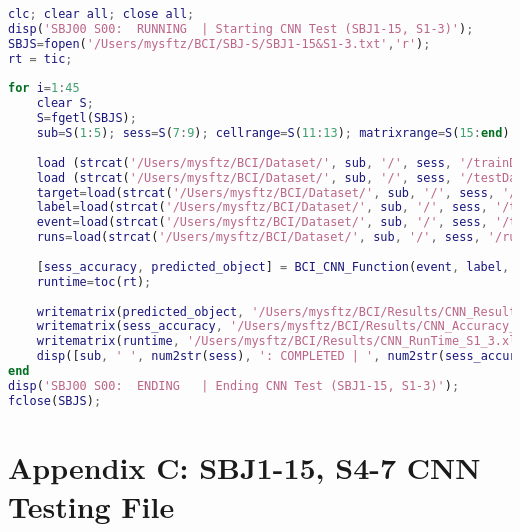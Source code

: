 \begin{lstlisting}[language=matlab]
clc; clear all; close all; 
disp('SBJ00 S00:  RUNNING  | Starting CNN Test (SBJ1-15, S1-3)');
SBJS=fopen('/Users/mysftz/BCI/SBJ-S/SBJ1-15&S1-3.txt','r');
rt = tic; 
    
for i=1:45
    clear S;
    S=fgetl(SBJS);         
    sub=S(1:5); sess=S(7:9); cellrange=S(11:13); matrixrange=S(15:end);
    
    load (strcat('/Users/mysftz/BCI/Dataset/', sub, '/', sess, '/trainData.mat'));
    load (strcat('/Users/mysftz/BCI/Dataset/', sub, '/', sess, '/testData.mat'));
    target=load(strcat('/Users/mysftz/BCI/Dataset/', sub, '/', sess, '/trainTargets.txt')); 
    label=load(strcat('/Users/mysftz/BCI/Dataset/', sub, '/', sess, '/testLabels.txt')); 
    event=load(strcat('/Users/mysftz/BCI/Dataset/', sub, '/', sess, '/testEvents.txt')); 
    runs=load(strcat('/Users/mysftz/BCI/Dataset/', sub, '/', sess, '/runs_per_block.txt'));
    
    [sess_accuracy, predicted_object] = BCI_CNN_Function(event, label, runs, sess, sub, target, testData, trainData);
    runtime=toc(rt); 
    
    writematrix(predicted_object, '/Users/mysftz/BCI/Results/CNN_Results_S1_3.xlsx', 'Range', matrixrange); 
    writematrix(sess_accuracy, '/Users/mysftz/BCI/Results/CNN_Accuracy_S1_3.xlsx', 'Range', cellrange); 
    writematrix(runtime, '/Users/mysftz/BCI/Results/CNN_RunTime_S1_3.xlsx', 'Range', cellrange); 
    disp([sub, ' ', num2str(sess), ': COMPLETED | ', num2str(sess_accuracy), '% Accuracy in ', num2str(runtime), 's']);
end
disp('SBJ00 S00:  ENDING   | Ending CNN Test (SBJ1-15, S1-3)'); 
fclose(SBJS); 
\end{lstlisting}

\newpage
\section*{Appendix C: SBJ1-15, S4-7 CNN Testing File}
\label{Appendix C: SBJ1-15, S4-7 CNN Testing File Section}

